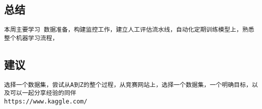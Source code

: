 \documentclass[11pt]{article}
\begin{document}
\hypertarget{ux603bux7ed3}{%
\subsection{总结}\label{ux603bux7ed3}}

\begin{verbatim}
本周主要学习 数据准备，构建监控工作，建立人工评估流水线，自动化定期训练模型上，熟悉整个机器学习流程，
\end{verbatim}

\hypertarget{ux5efaux8bae}{%
\subsection{建议}\label{ux5efaux8bae}}

\begin{verbatim}
选择一个数据集，尝试从A到Z的整个过程，从竞赛网站上，选择一个数据集，一个明确目标，以及可以一起分享经验的同伴
https://www.kaggle.com/
\end{verbatim}

    


    
    
    
\end{document}
